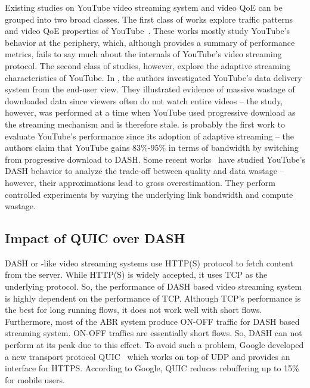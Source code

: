 Existing studies on YouTube video streaming system and video \ac{QoE} can be grouped into two broad classes. The first class of works explore traffic patterns and video \ac{QoE} properties of YouTube~\cite{gill2007youtube,krishnappa2013dashing,wamser2016modeling,wamser2015poster,6757893ieeeexp,7129790ieeeexp}. These works mostly study YouTube's behavior at the periphery, which, although provides a summary of performance metrics, fails to say much about the internals of YouTube's video streaming protocol. The second class of studies, however, explore the adaptive streaming characteristics of YouTube. In \cite{finamore2011youtube}, the authors investigated YouTube's data delivery system from the end-user view. They illustrated evidence of massive wastage of downloaded data since viewers often do not watch entire videos -- the study, however, was performed at a time when YouTube used progressive download as the streaming mechanism and is therefore stale. \cite{krishnappa2013dashing} is probably the first work to evaluate YouTube's performance since its adoption of adaptive streaming -- the authors claim that YouTube gains $83\%$-$95\%$ in terms of bandwidth by switching from progressive download to DASH. Some recent works~\cite{sieber2015cost,seufert2015youtube,sieber2016sacrificing} have studied YouTube's DASH behavior to analyze the trade-off between quality and data wastage -- however, their approximations lead to gross overestimation. They perform controlled experiments by varying the underlying link bandwidth and compute wastage.

\subsection{Impact of QUIC over DASH}
\ac{DASH} or -like video streaming systems use \ac{HTTP(S)} protocol to fetch content from the server. While \ac{HTTP(S)} is widely accepted, it uses \ac{TCP} as the underlying protocol. So, the performance of \ac{DASH} based video streaming system is highly dependent on the performance of \ac{TCP}. Although \ac{TCP}'s performance is the best for long running flows, it does not work well with short flows. Furthermore, most of the \ac{ABR} system produce ON-OFF traffic for \ac{DASH} based streaming system. ON-OFF traffics are essentially short flows. So, \ac{DASH} can not perform at its peak due to this effect. To avoid such a problem, Google developed a new transport protocol \ac{QUIC}~\cite{langley2017quic} which works on top of \ac{UDP} and provides an interface for \ac{HTTPS}. According to Google, \ac{QUIC} reduces rebuffering up to 15\% for mobile users.

